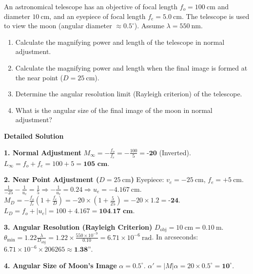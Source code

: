 \documentclass[11pt]{article}
\begin{document}
\begin{exoresolu}
An astronomical telescope has an objective of focal length $f_o = 100\ \mathrm{cm}$ and diameter $10\ \mathrm{cm}$, and an eyepiece of focal length $f_e = 5.0\ \mathrm{cm}$. The telescope is used to view the moon (angular diameter $\approx 0.5^\circ$). Assume $\lambda = 550\ \mathrm{nm}$.
\begin{enumerate}
\item Calculate the magnifying power and length of the telescope in normal adjustment.
\item Calculate the magnifying power and length when the final image is formed at the near point ($D = 25\ \mathrm{cm}$).
\item Determine the angular resolution limit (Rayleigh criterion) of the telescope.
\item What is the angular size of the final image of the moon in normal adjustment?
\end{enumerate}
\tcblower
\textbf{Detailed Solution}

\textbf{1. Normal Adjustment}
$M_\infty = -\frac{f_o}{f_e} = -\frac{100}{5} = \textbf{-20}$ (Inverted).
$L_\infty = f_o + f_e = 100 + 5 = \textbf{105 cm}$.

\textbf{2. Near Point Adjustment ($D = 25\ \mathrm{cm}$)}
Eyepiece: $v_e = -25\ \mathrm{cm}$, $f_e = +5\ \mathrm{cm}$.
$\frac{1}{-25} - \frac{1}{u_e} = \frac{1}{5} \Rightarrow -\frac{1}{u_e} = 0.24 \Rightarrow u_e = -4.167\ \mathrm{cm}$.
$M_D = -\frac{f_o}{f_e}\left(1 + \frac{f_e}{D}\right) = -20 \times \left(1 + \frac{5}{25}\right) = -20 \times 1.2 = \textbf{-24}$.
$L_D = f_o + |u_e| = 100 + 4.167 = \textbf{104.17 cm}$.

\textbf{3. Angular Resolution (Rayleigh Criterion)}
$D_{\text{obj}} = 10\ \mathrm{cm} = 0.10\ \mathrm{m}$.
$\theta_{\min} = 1.22 \frac{\lambda}{D_{\text{obj}}} = 1.22 \times \frac{550 \times 10^{-9}}{0.10} = 6.71 \times 10^{-6}\ \mathrm{rad}$.
In arcseconds: $6.71 \times 10^{-6} \times 206265 \approx \textbf{1.38''}$.

\textbf{4. Angular Size of Moon's Image}
$\alpha = 0.5^\circ$. $\alpha' = |M| \alpha = 20 \times 0.5^\circ = \textbf{10}^\circ$.
\end{exoresolu}
\end{document}
